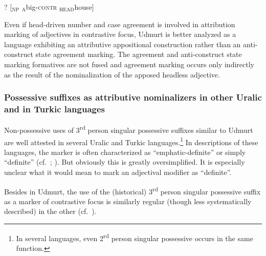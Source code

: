 \begin{exe} \label{udmurt notapposition}
\ex ? [$_{\text{NP}}$ $_{\text{A}}$big-\textsc{contr} $_{\text{HEAD}}$house$]$
\end{exe}
Even if head\hyp{}driven number and case agreement is involved in attribution marking of adjectives in contrastive focus, Udmurt is better analyzed as a language exhibiting an attributive appositional construction rather than an anti\hyp{}construct state agreement marking. The agreement and anti\hyp{}construct state marking formatives are not fused and agreement marking occurs only indirectly as the result of the nominalization of the apposed headless adjective.

\subsubsection[Possessive suffixes as attributive nominalizers]{Possessive suffixes as attributive nominalizers in other Uralic and in Turkic languages}
Non-possessive uses of 3\textsuperscript{rd} person singular possessive suffixes similar to Udmurt are well attested in several Uralic and Turkic languages.\footnote{In several languages, even 2\textsuperscript{rd} person singular possessive occurs in the same function.} In descriptions of these languages, the marker is often characterized as “emphatic-definite” or simply “definite” (cf.~\citealt[148]{tauli1966}; \citealt{kunnap2004}). But obviously this is greatly oversimplified. It is especially unclear what it would mean to mark an adjectival modifier as “definite”.

Besides in Udmurt, the use of the (historical) 3\textsuperscript{rd} person singular possessive suffix as a marker of contrastive focus is similarly regular (though less systematically described) in the other  (cf.~\citealt[67]{serebrennikov1963}).%

